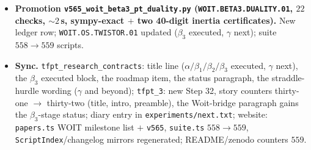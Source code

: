 \begin{itemize}[leftmargin=1.5em]
--- the mirror whose descent \texttt{v524} certified: $\Theta_{\mathrm{phys}}$ is the
quotient shadow of the duality (regressions re-verified: Gram PD $(16,0,0)$, anti-unitary
with $\eta_\perp=+i$, $\Theta^2=+1$ per sector, time reversal, torsor closure). Role
separation complete: $\sigma_{\mathrm{std}}\sim$ the OS cut (the metric), the $\Phi$-twisted
duality $\sim$ the descending mirror. Free/quotient level only; $\mathcal A_{\mathrm{hol}}$
untouched; all seven kill tests stay live; no marker moves.
\item \textbf{Promotion \texttt{v565\_woit\_beta3\_pt\_duality.py}
(\texttt{WOIT.BETA3.DUALITY.01}, $22$ checks, ${\sim}2$\,s, sympy-exact $+$ two 40-digit
inertia certificates).} New ledger row; \texttt{WOIT.OS.TWISTOR.01} updated ($\beta_3$
executed, $\gamma$ next); suite $558\to559$ scripts.
\item \textbf{Sync.} \texttt{tfpt\_research\_contracts}: title line
($\alpha/\beta_1/\beta_2/\beta_3$ executed, $\gamma$ next), the $\beta_3$ executed block, the
roadmap item, the status paragraph, the straddle-hurdle wording ($\gamma$ and beyond);
\texttt{tfpt\_3}: new Step 32, story counters thirty-one $\to$ thirty-two (title, intro,
preamble), the Woit-bridge paragraph gains the $\beta_3$-stage status; diary entry in
\texttt{experiments/next.txt}; website: \texttt{papers.ts} WOIT milestone list $+$
\texttt{v565}, \texttt{suite.ts} $558\to559$, \texttt{ScriptIndex}/changelog mirrors
regenerated; README/zenodo counters $559$.
\end{itemize}

